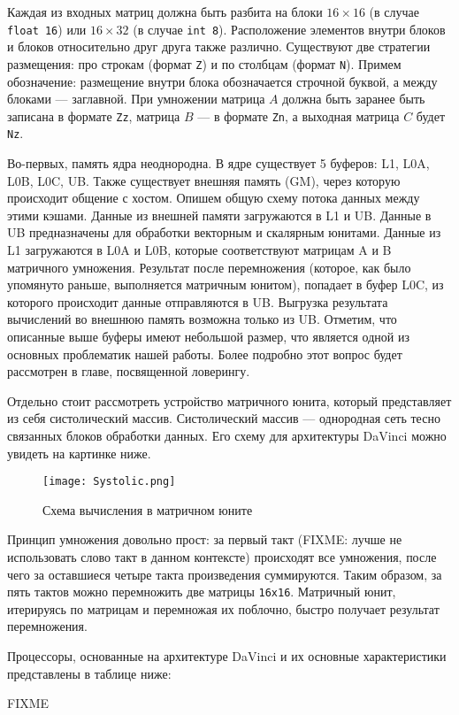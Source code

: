 Каждая из входных матриц должна быть разбита на блоки $16 \times 16$
(в случае \texttt{float 16}) или $16 \times 32$ (в случае \texttt{int 8}).
Расположение элементов внутри блоков и блоков относительно друг друга также
различно. Существуют две стратегии размещения: про строкам (формат \texttt{Z})
и по столбцам (формат \texttt{N}). Примем обозначение: размещение внутри блока
обозначается строчной буквой, а между блоками --- заглавной. При умножении
матрица $A$ должна быть заранее быть записана в формате \texttt{Zz},
матрица $B$ --- в формате \texttt{Zn}, а выходная матрица $C$ будет \texttt{Nz}.

Во-первых, память ядра неоднородна. В ядре существует 5 буферов:
L1, L0A, L0B, L0C, UB. Также существует внешняя память (GM), через которую
происходит общение с хостом. Опишем общую схему потока данных между этими кэшами.
Данные из внешней памяти загружаются в L1 и UB. Данные в UB предназначены для
обработки векторным и скалярным юнитами. Данные из L1 загружаются в L0A и L0B,
которые соответствуют матрицам A и B матричного умножения. Результат после
перемножения (которое, как было упомянуто раньше, выполняется матричным юнитом),
попадает в буфер L0C, из которого происходит данные отправляются в UB. Выгрузка
результата вычислений во внешнюю память возможна только из UB. Отметим, что
описанные выше буферы имеют небольшой размер, что является одной из основных
проблематик нашей работы. Более подробно этот вопрос будет рассмотрен в главе,
посвященной ловерингу.

Отдельно стоит рассмотреть устройство матричного юнита, который представляет
из себя систолический массив. Систолический массив --- однородная сеть тесно
связанных блоков обработки данных. Его схему для архитектуры DaVinci можно
увидеть на картинке ниже. 

\begin{figure}[h!]
    \centering
    \texttt{[image: Systolic.png]}
    \caption{Схема вычисления в матричном юните}
\end{figure}

Принцип умножения довольно прост: за первый такт (FIXME: лучше не использовать
слово такт в данном контексте) происходят все умножения,
после чего за оставшиеся четыре такта произведения суммируются. Таким
образом, за пять тактов можно перемножить две матрицы \texttt{16x16}.
Матричный юнит, итерируясь по матрицам и перемножая их поблочно, быстро
получает результат перемножения.

Процессоры, основанные на архитектуре DaVinci и их основные характеристики
представлены в таблице ниже:

FIXME

\newpage
